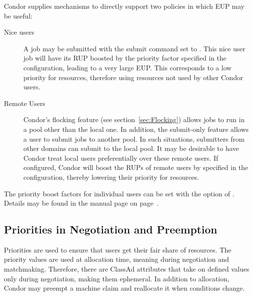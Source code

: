 Condor supplies mechanisms to directly support two policies in which EUP may
be useful:
\begin{description}
	\item[Nice users]  A job may be submitted with the submit command 
	 set to .
	This nice user job will have its RUP boosted by the 
	 priority factor specified in the 
	configuration, leading to a very large EUP.
	This corresponds to a low priority for resources,
	therefore using resources not used by other Condor users.

	\item[Remote Users] Condor's flocking feature (see
	section~\ref{sec:Flocking}) allows jobs to run in a pool
        other than the local one.
	In addition, the submit-only feature allows a user 
	to submit jobs to another pool.
	In such situations, submitters from other domains
	can submit to the local pool.
	It may be desirable to have Condor treat local users
	preferentially over these remote users.
	If configured, Condor will boost the RUPs of remote users by
	specified in the configuration,
	thereby lowering their priority for resources.
\end{description}

The priority boost factors for individual users can be set with the 
 option of .
Details may be found in the  manual page 
on page~\pageref{man-condor-userprio}.


\subsection{Priorities in Negotiation and Preemption}
Priorities are used to ensure that users get their fair share of resources.  
The priority values are used at allocation time, meaning during
negotiation and matchmaking.
Therefore, there are ClassAd attributes that take on defined values
only during negotiation, making them ephemeral.
In addition to allocation, Condor may preempt a machine claim 
and reallocate it when conditions change.

